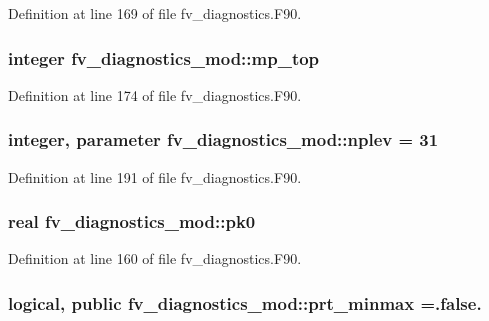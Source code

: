 Definition at line 169 of file fv\-\_\-diagnostics.\-F90.

\subsubsection[{mp\-\_\-top}]{\setlength{\rightskip}{0pt plus 5cm}integer fv\-\_\-diagnostics\-\_\-mod\-::mp\-\_\-top\hspace{0.3cm}{\ttfamily [private]}}\label{classfv__diagnostics__mod_ab88b207f7720c56604f62951e3d1eaba}


Definition at line 174 of file fv\-\_\-diagnostics.\-F90.

\subsubsection[{nplev}]{\setlength{\rightskip}{0pt plus 5cm}integer, parameter fv\-\_\-diagnostics\-\_\-mod\-::nplev = 31\hspace{0.3cm}{\ttfamily [private]}}\label{classfv__diagnostics__mod_a1d88b3620cc9d26f5c198af4e052445b}


Definition at line 191 of file fv\-\_\-diagnostics.\-F90.

\subsubsection[{pk0}]{\setlength{\rightskip}{0pt plus 5cm}real fv\-\_\-diagnostics\-\_\-mod\-::pk0\hspace{0.3cm}{\ttfamily [private]}}\label{classfv__diagnostics__mod_a8c1566f74237104b24c6a20268168281}


Definition at line 160 of file fv\-\_\-diagnostics.\-F90.

\subsubsection[{prt\-\_\-minmax}]{\setlength{\rightskip}{0pt plus 5cm}logical, public fv\-\_\-diagnostics\-\_\-mod\-::prt\-\_\-minmax =.false.}\label{classfv__diagnostics__mod_a8117f5640cc7dedfae666efcc3c9649e}


